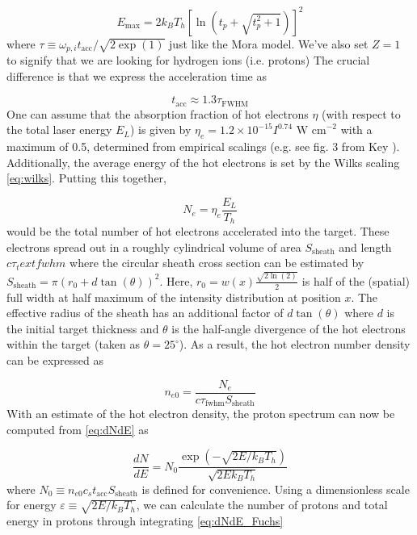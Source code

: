 \begin{equation}
	E_\text{max} = 2 k_B T_h [\ln(t_p + \sqrt{t_p^2 + 1})]^2 \label{eq:fuchs_maxE}
\end{equation}
where $\tau \equiv \omega_{p,i} t_\text{acc} / \sqrt{2 \exp(1)}$ just like the Mora model. We've also set $Z=1$ to signify that we are looking for hydrogen ions (i.e. protons) The crucial difference is that we express the acceleration time as 

\begin{equation}
	t_\text{acc} \approx 1.3 \tau_\text{FWHM} \label{eq:fuchs_multiplier}
\end{equation}
One can assume that the absorption fraction of hot electrons $\eta$ (with respect to the total laser energy $E_L$) is given by $\eta_e = 1.2 \times 10^{-15} I^{0.74} \text{ W cm}^{-2}$ with a maximum of 0.5, determined from empirical scalings (e.g. see fig. 3 from Key \cite{Key_1998_PoP}). Additionally, the average energy of the hot electrons is set by the Wilks scaling \cref{eq:wilks}. Putting this together, 

\begin{equation}
	N_e = \eta_e \frac{E_L}{T_h}
\end{equation}
would be the total number of hot electrons accelerated into the target. These electrons spread out in a roughly cylindrical volume of area $S_\text{sheath}$ and length $c \tau_text{fwhm}$ where the circular sheath cross section can be estimated by $S_\text{sheath} = \pi (r_0 + d \tan(\theta))^2$. Here, $r_0 = w(x) \frac{\sqrt{2 \ln(2)}}{2}$ is half of the (spatial) full width at half maximum of the intensity distribution at position $x$. The effective radius of the sheath has an additional factor of $d \tan(\theta)$ where $d$ is the initial target thickness and $\theta$ is the half-angle divergence of the hot electrons within the target (taken as $\theta = 25^\circ$). As a result, the hot electron number density can be expressed as 
	
\begin{equation}
	n_{e0} = \frac{N_e}{c \tau_\text{fwhm} S_\text{sheath}}
\end{equation}
With an estimate of the hot electron density, the proton spectrum can now be computed from \cref{eq:dNdE} as 

\begin{equation}
	\frac{dN}{dE} = N_0 \frac{\exp(-\sqrt{2 E/k_B T_h})}{\sqrt{2 E k_B T_h}} \label{eq:dNdE_Fuchs}
\end{equation}
where $N_0 \equiv n_{e0} c_s t_\text{acc} S_\text{sheath}$ is defined for convenience. Using a dimensionless scale for energy $\varepsilon \equiv \sqrt{2 E / k_B T_h}$, we can calculate the number of protons and total energy in protons through integrating \cref{eq:dNdE_Fuchs}

